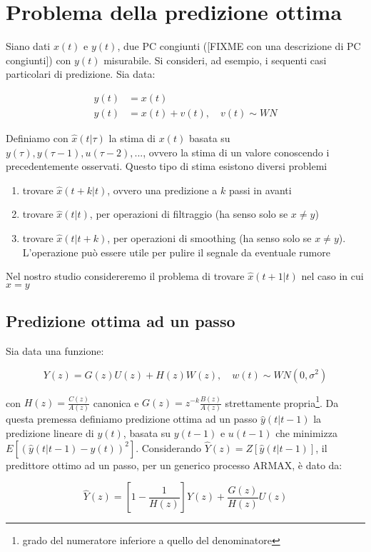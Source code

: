\section{Problema della predizione ottima}
Siano dati $x(t)$ e $y(t)$, due PC congiunti ([FIXME con una descrizione di PC congiunti]) con $y(t)$ misurabile. Si consideri, ad esempio, i sequenti casi particolari di predizione. Sia data:

  \begin{align*}
    y(t)&=x(t)\\
    y(t)&=x(t)+v(t),\quad v(t) \sim WN
  \end{align*}

Definiamo con $\hat{x}(t|\tau)$ la stima di $x(t)$ basata su $y(\tau),y(\tau-1),u(\tau-2),...$, ovvero la stima di un valore conoscendo i precedentemente osservati. Questo tipo di stima esistono diversi problemi

\begin{enumerate}
  \item trovare $\hat{x}(t+k|t)$, ovvero una predizione a $k$ passi in avanti
  \item trovare $\hat{x}(t|t)$, per operazioni di filtraggio (ha senso solo se $x \neq y$)
  \item trovare $\hat{x}(t|t+k)$, per operazioni di smoothing (ha senso solo se $x \neq y$). L'operazione può essere utile per pulire il segnale da eventuale rumore
\end{enumerate}
Nel nostro studio considereremo il problema di trovare $\hat{x}(t+1|t)$ nel caso in cui $x=y$
\subsection{Predizione ottima ad un passo}
Sia data una funzione:

  \[ Y(z)=G(z)U(z)+H(z)W(z), \quad w(t)\sim WN(0,\sigma^2) \]

con $H(z)=\frac{C(z)}{A(z)}$ canonica e $G(z)=z^{-k}\frac{B(z)}{A(z)}$ strettamente propria\footnote{grado del numeratore inferiore a quello del denominatore}. Da questa premessa definiamo predizione ottima ad un passo $\hat{y}(t|t-1)$ la predizione lineare di $y(t)$, basata su $y(t-1)$ e $u(t-1)$ che minimizza $E[(\hat{y}(t|t-1)-y(t))^2]$.\newline
Considerando $\hat{Y}(z)=Z[\hat{y}(t|t-1)]$, il predittore ottimo ad un passo, per un generico processo ARMAX, è dato da:

  \[ \hat{Y}(z)=\left[ 1-\frac{1}{H(z)} \right]Y(z)+\frac{G(z)}{H(z)}U(z)  \]
  
